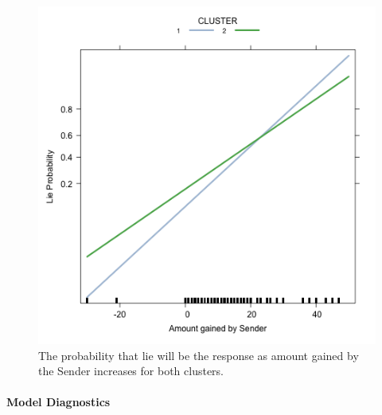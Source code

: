 \documentclass[man, floatsintext]{apa7}
\begin{document}
\begin{figure}[H]
	\centering
	\includegraphics[width=0.75\linewidth]{../plots/R_selfgain/effects.png}
	\caption{The probability that lie will be the response as amount gained by the Sender increases for both clusters.}
	\label{fig:InteractionEffects}
\end{figure}

\paragraph{Model Diagnostics}
\end{document}

